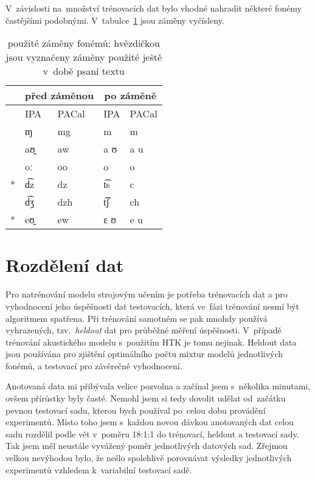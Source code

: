 V~závislosti na~množství trénovacích dat bylo vhodné nahradit některé fonémy
častějšími podobnými. V~tabulce~\ref{tab:phonesed} jsou záměny vyčísleny.
\begin{table}[htpb]
\begin{center}
\begin{tabular}{|r|l|l||l|l|}
\hline
&
\multicolumn{2}{|c||}{před záměnou} &
\multicolumn{2}{|c|}{po záměně} \\
\hline
& IPA & PACal & IPA & PACal \\
\hline
    & ɱ  & mg & m & m \\
    & aʊ̯ & aw & a ʊ & a u \\
    & oː & oo & o & o \\
\** & d͡z & dz & t͡s & c \\
    & d͡ʒ & dzh & t͡ʃ & ch \\
\** & eʊ̯ & ew & ɛ ʊ & e u \\
\hline
\end{tabular}
\caption{použité záměny fonémů; hvězdičkou jsou vyznačeny záměny použité ještě
v~době psaní textu}\label{tab:phonesed}
\end{center}
\end{table}
\normalfont

\section{Rozdělení dat}

Pro natrénování modelu strojovým učením je potřeba trénovacích dat a pro
vyhodnocení jeho úspěšnosti dat testovacích, která ve~fázi trénování nesmí být
algoritmem spatřena. Při trénování samotném se pak mnohdy používá vyhrazených,
tzv.~\textit{heldout} dat pro průběžné měření úspěšnosti. V~případě trénování
akustického modelu s~použitím HTK je tomu nejinak. Heldout data jsou používána
pro zjištění optimálního počtu mixtur modelů jednotlivých fonémů, a testovací
pro závěrečné vyhodnocení.

Anotovaná data mi přibývala velice pozvolna a začínal jsem s~několika minutami,
ovšem přírůstky byly časté. Nemohl jsem si tedy dovolit udělat od~začátku pevnou
testovací sadu, kterou bych používal po~celou dobu provádění experimentů. Místo
toho jsem s~každou novou dávkou anotovaných dat celou sadu rozdělil podle vět
v~poměru 18:1:1 do trénovací, heldout a testovací sady. Tak jsem měl neustále
vyvážený poměr jednotlivých datových sad. Zřejmou velkou nevýhodou bylo, že
nešlo spolehlivě porovnávat výsledky jednotlivých experimentů vzhledem
k~variabilní testovací sadě.

